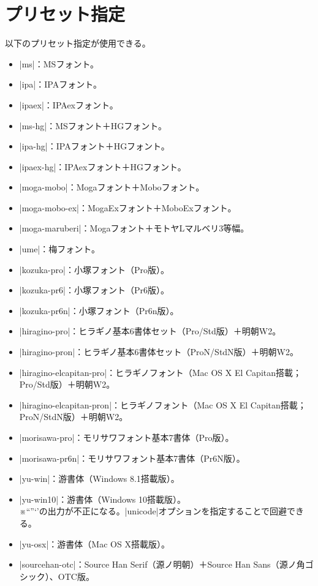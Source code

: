 \documentclass[dvipdfmx]{jlreq}
\begin{document}
\section{プリセット指定}

以下のプリセット指定が使用できる。

\begin{itemize}
\item |ms|：MSフォント。
\item |ipa|：IPAフォント。
\item |ipaex|：IPAexフォント。
\item |ms-hg|：MSフォント＋HGフォント。
\item |ipa-hg|：IPAフォント＋HGフォント。
\item |ipaex-hg|：IPAexフォント＋HGフォント。
\item |moga-mobo|：Mogaフォント＋Moboフォント。
\item |moga-mobo-ex|：MogaExフォント＋MoboExフォント。
\item |moga-maruberi|：Mogaフォント＋モトヤLマルベリ3等幅。
\item |ume|：梅フォント。
\item |kozuka-pro|：小塚フォント（Pro版）。
\item |kozuka-pr6|：小塚フォント（Pr6版）。
\item |kozuka-pr6n|：小塚フォント（Pr6n版）。
\item |hiragino-pro|：ヒラギノ基本6書体セット（Pro/Std版）＋明朝W2。
\item |hiragino-pron|：ヒラギノ基本6書体セット（ProN/StdN版）＋明朝W2。
\item |hiragino-elcapitan-pro|：ヒラギノフォント（Mac OS X El Capitan搭載；Pro/Std版）＋明朝W2。
\item |hiragino-elcapitan-pron|：ヒラギノフォント（Mac OS X El Capitan搭載；ProN/StdN版）＋明朝W2。
\item |morisawa-pro|：モリサワフォント基本7書体（Pro版）。
\item |morisawa-pr6n|：モリサワフォント基本7書体（Pr6N版）。
\item |yu-win|：游書体（Windows 8.1搭載版）。
\item |yu-win10|：游書体（Windows 10搭載版）。\\
  ※“”‘’の出力が不正になる。|unicode|オプションを指定することで回避できる。
\item |yu-osx|：游書体（Mac OS X搭載版）。
\item |sourcehan-otc|：Source Han Serif（源ノ明朝）＋Source Han Sans（源ノ角ゴシック）、OTC版。\\

\end{itemize}
\end{document}
